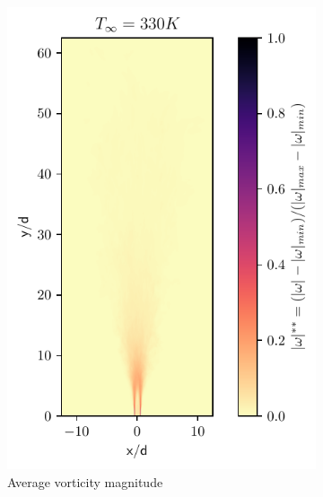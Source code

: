 \begin{figure}[htbp!]
\begin{subfigure}{0.25\textwidth}
	\includegraphics[scale=.65]{figures/Plots/vertical/330/magvort_scaled_vert_avg_330.pdf}
	\caption{Average vorticity magnitude} \label{330_magvort_3}
\end{subfigure}
\hfill
\begin{subfigure}{0.25\textwidth}
	\centering

\end{subfigure}
\end{figure}
